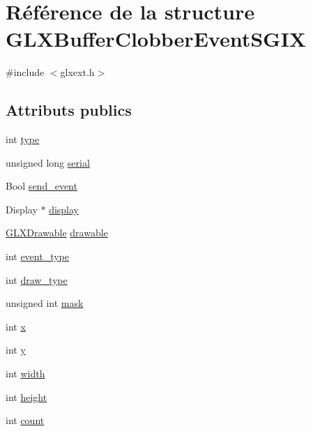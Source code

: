 \hypertarget{struct_g_l_x_buffer_clobber_event_s_g_i_x}{\section{Référence de la structure G\-L\-X\-Buffer\-Clobber\-Event\-S\-G\-I\-X}
\label{struct_g_l_x_buffer_clobber_event_s_g_i_x}
}


{\ttfamily \#include $<$glxext.\-h$>$}

\subsection*{Attributs publics}
\begin{DoxyCompactItemize}
\item 
int \hyperlink{struct_g_l_x_buffer_clobber_event_s_g_i_x_a36e3e8a5feea664623ea43d0f273b63a}{type}
\item 
unsigned long \hyperlink{struct_g_l_x_buffer_clobber_event_s_g_i_x_ac295e3276a7986eeae4d6a2a28c7e0b7}{serial}
\item 
Bool \hyperlink{struct_g_l_x_buffer_clobber_event_s_g_i_x_af43bf0edbe40a74ef58dfb546a75118b}{send\-\_\-event}
\item 
Display $\ast$ \hyperlink{struct_g_l_x_buffer_clobber_event_s_g_i_x_afef060d81026da75c846727f4a3de9d4}{display}
\item 
\hyperlink{glx_8h_a826f51745d9d6c81bdbac47ae2b80cf7}{G\-L\-X\-Drawable} \hyperlink{struct_g_l_x_buffer_clobber_event_s_g_i_x_a9c45674193ed80a79261c3b7518ee04f}{drawable}
\item 
int \hyperlink{struct_g_l_x_buffer_clobber_event_s_g_i_x_a0b405123f1d6528f1f4dfa7ff92bde9b}{event\-\_\-type}
\item 
int \hyperlink{struct_g_l_x_buffer_clobber_event_s_g_i_x_a25c31e8cbec0919f74a1e93ae74175b1}{draw\-\_\-type}
\item 
unsigned int \hyperlink{struct_g_l_x_buffer_clobber_event_s_g_i_x_a74b4ad1ad3cac011001151411f621da1}{mask}
\item 
int \hyperlink{struct_g_l_x_buffer_clobber_event_s_g_i_x_a5118d48c3c8d5253d39922b5014b52ff}{x}
\item 
int \hyperlink{struct_g_l_x_buffer_clobber_event_s_g_i_x_aef21efa11558a5b67861f96471c56003}{y}
\item 
int \hyperlink{struct_g_l_x_buffer_clobber_event_s_g_i_x_adad23535733161528427584a42bfc6eb}{width}
\item 
int \hyperlink{struct_g_l_x_buffer_clobber_event_s_g_i_x_a7838dbabb76c22aa8241310a3f2363ea}{height}
\item 
int \hyperlink{struct_g_l_x_buffer_clobber_event_s_g_i_x_ad8f4f0aae058e0a1ff542679823e37a9}{count}
\end{DoxyCompactItemize}


